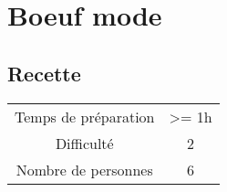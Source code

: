 \newpage
\section{Boeuf mode}
    \label{sec:Boeuf mode}
    \subsection{Recette}
    \vspace{1cm}


    \begin{center}
        \begin{tabular}{c|c}
            Temps de préparation & >= 1h \\
            Difficulté & 2 \\
            Nombre de personnes & 6 
        \end{tabular}
    \end{center}{}

    \vspace{1cm}
    \hline
    \vspace{1cm}

